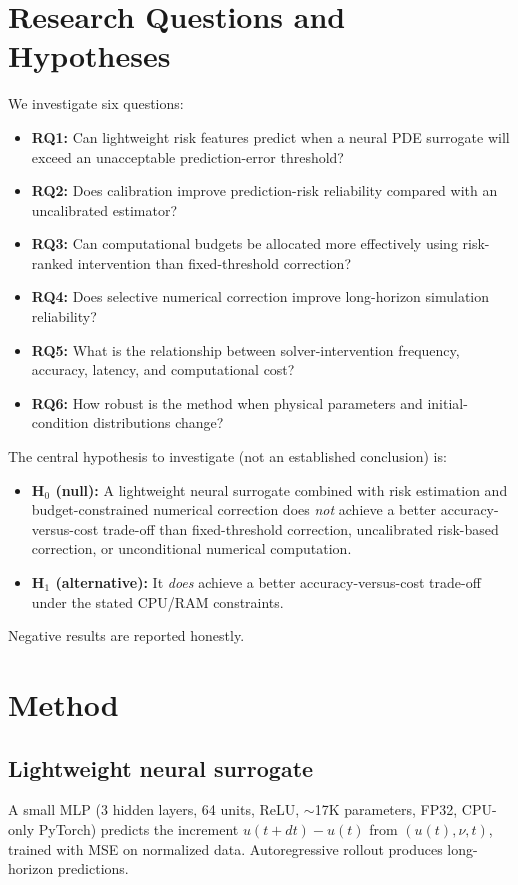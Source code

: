 \documentclass[11pt]{article}
\begin{document}
\section{Research Questions and Hypotheses}
We investigate six questions:
\begin{itemize}
\item \textbf{RQ1:} Can lightweight risk features predict when a neural PDE surrogate will exceed an unacceptable prediction-error threshold?
\item \textbf{RQ2:} Does calibration improve prediction-risk reliability compared with an uncalibrated estimator?
\item \textbf{RQ3:} Can computational budgets be allocated more effectively using risk-ranked intervention than fixed-threshold correction?
\item \textbf{RQ4:} Does selective numerical correction improve long-horizon simulation reliability?
\item \textbf{RQ5:} What is the relationship between solver-intervention frequency, accuracy, latency, and computational cost?
\item \textbf{RQ6:} How robust is the method when physical parameters and initial-condition distributions change?
\end{itemize}

The central hypothesis to investigate (not an established conclusion) is:
\begin{itemize}
\item \textbf{H$_0$ (null):} A lightweight neural surrogate combined with risk estimation and budget-constrained numerical correction does \emph{not} achieve a better accuracy-versus-cost trade-off than fixed-threshold correction, uncalibrated risk-based correction, or unconditional numerical computation.
\item \textbf{H$_1$ (alternative):} It \emph{does} achieve a better accuracy-versus-cost trade-off under the stated CPU/RAM constraints.
\end{itemize}

Negative results are reported honestly.

\section{Method}
\label{sec:method}
\subsection{Lightweight neural surrogate}
A small MLP (3 hidden layers, 64 units, ReLU, $\sim$17K parameters, FP32, CPU-only PyTorch) predicts the increment $u(t+dt)-u(t)$ from $(u(t), \nu, t)$, trained with MSE on normalized data. Autoregressive rollout produces long-horizon predictions.
\end{document}

